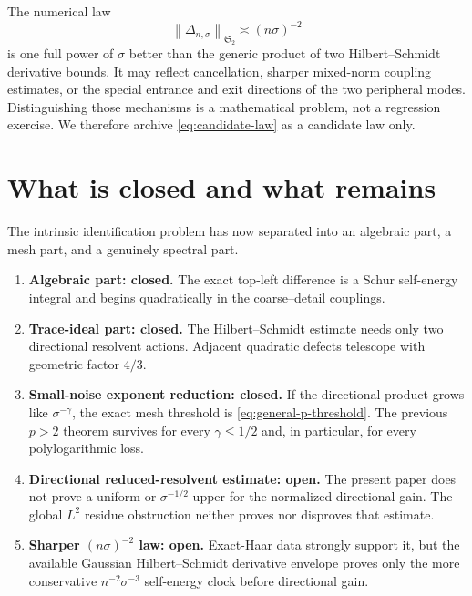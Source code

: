\documentclass[11pt]{article}
\theoremstyle{definition}
\theoremstyle{remark}
\newcommand{\HS}{\mathfrak S_2}
\newcommand{\norm}[1]{\left\lVert #1\right\rVert}
\begin{document}
The numerical law
\begin{equation}
 \norm{\Delta_{n,\sigma}}_{\HS}
 \asymp(n\sigma)^{-2}
 \label{eq:candidate-law}
\end{equation}
is one full power of $\sigma$ better than the generic product of two
Hilbert--Schmidt derivative bounds.  It may reflect cancellation, sharper
mixed-norm coupling estimates, or the special entrance and exit directions
of the two peripheral modes.  Distinguishing those mechanisms is a
mathematical problem, not a regression exercise.  We therefore archive
\eqref{eq:candidate-law} as a candidate law only.

\section{What is closed and what remains}
\label{sec:conclusion}

The intrinsic identification problem has now separated into an algebraic
part, a mesh part, and a genuinely spectral part.

\begin{enumerate}[leftmargin=2.2em]
 \item \textbf{Algebraic part: closed.}
 The exact top-left difference is a Schur self-energy integral and begins
 quadratically in the coarse--detail couplings.

 \item \textbf{Trace-ideal part: closed.}
 The Hilbert--Schmidt estimate needs only two directional resolvent actions.
 Adjacent quadratic defects telescope with geometric factor $4/3$.

 \item \textbf{Small-noise exponent reduction: closed.}
 If the directional product grows like $\sigma^{-\gamma}$, the exact mesh
 threshold is \eqref{eq:general-p-threshold}.  The previous $p>2$ theorem
 survives for every $\gamma\le1/2$ and, in particular, for every
 polylogarithmic loss.

 \item \textbf{Directional reduced-resolvent estimate: open.}
 The present paper does not prove a uniform or $\sigma^{-1/2}$ upper for the
 normalized directional gain.  The global $L^2$ residue obstruction neither
 proves nor disproves that estimate.

 \item \textbf{Sharper $(n\sigma)^{-2}$ law: open.}
 Exact-Haar data strongly support it, but the available Gaussian
 Hilbert--Schmidt derivative envelope proves only the more conservative
 $n^{-2}\sigma^{-3}$ self-energy clock before directional gain.
\end{enumerate}
\end{document}
